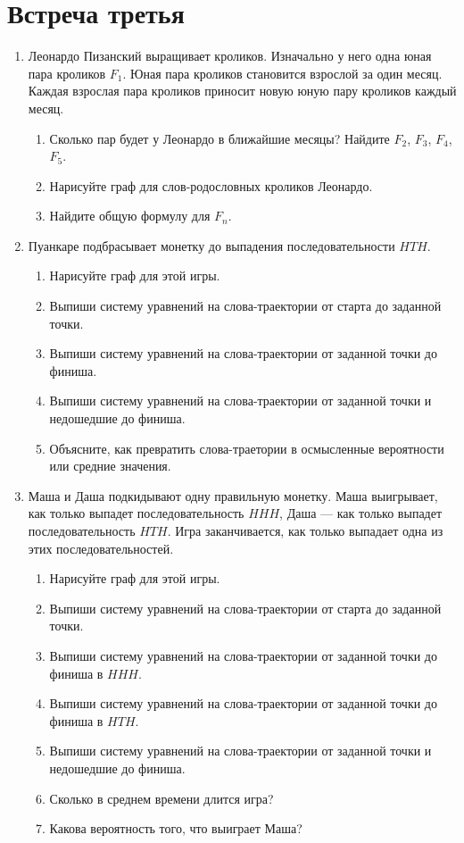 \documentclass[12pt]{article}
\begin{document}
\section{Встреча третья}
\begin{enumerate}
    \item Леонардо Пизанский выращивает кроликов. 
    Изначально у него одна юная пара кроликов $F_1$.
    Юная пара кроликов становится взрослой за один месяц. 
    Каждая взрослая пара кроликов приносит новую юную пару кроликов каждый месяц. 
    \begin{enumerate}
        \item Сколько пар будет у Леонардо в ближайшие месяцы? Найдите $F_2$, $F_3$, $F_4$, $F_5$.
        \item Нарисуйте граф для слов-родословных кроликов Леонардо. 
        \item Найдите общую формулу для $F_n$.
    \end{enumerate}
    
    \item Пуанкаре подбрасывает монетку до выпадения последовательности $HTH$.

\begin{enumerate}[label=\alph*)]
    \item Нарисуйте граф для этой игры. 
    \item Выпиши систему уравнений на слова-траектории от старта до заданной точки. 
    \item Выпиши систему уравнений на слова-траектории от заданной точки до финиша. 
    \item Выпиши систему уравнений на слова-траектории от заданной точки и недошедшие до финиша. 
    \item Объясните, как превратить слова-траетории в осмысленные вероятности или средние значения.
\end{enumerate}

\item Маша и Даша подкидывают одну правильную монетку. 
Маша выигрывает, как только выпадет последовательность $HHH$, Даша — как только выпадет последовательность $HTH$.
Игра заканчивается, как только выпадает одна из этих последовательностей. 

\begin{enumerate}[label=\alph*)]
    \item Нарисуйте граф для этой игры. 
    \item Выпиши систему уравнений на слова-траектории от старта до заданной точки. 
    \item Выпиши систему уравнений на слова-траектории от заданной точки до финиша в $HHH$. 
    \item Выпиши систему уравнений на слова-траектории от заданной точки до финиша в $HTH$. 
    \item Выпиши систему уравнений на слова-траектории от заданной точки и недошедшие до финиша. 
    \item Сколько в среднем времени длится игра?
    \item Какова вероятность того, что выиграет Маша?
\end{enumerate}


\end{enumerate}
\end{document}
